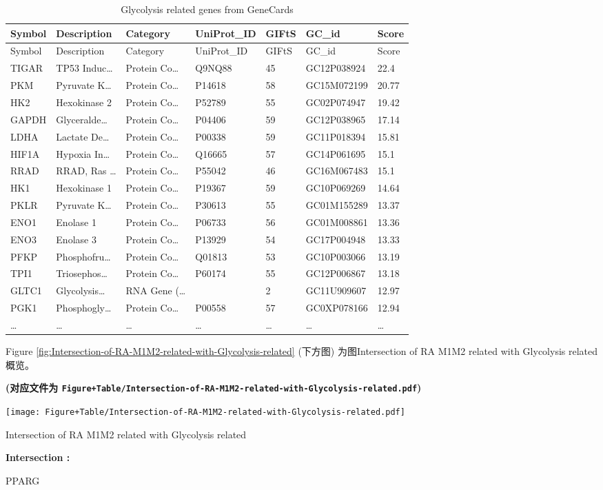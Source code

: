 \documentclass[
]{article}
\begin{document}
\begin{longtable}[]{@{}lllllll@{}}
\caption{\label{tab:Glycolysis-related-genes-from-GeneCards}Glycolysis related genes from GeneCards}\tabularnewline
\toprule
Symbol & Description & Category & UniProt\_ID & GIFtS & GC\_id & Score\tabularnewline
\midrule
\endfirsthead
\toprule
Symbol & Description & Category & UniProt\_ID & GIFtS & GC\_id & Score\tabularnewline
\midrule
\endhead
TIGAR & TP53 Induc\ldots{} & Protein Co\ldots{} & Q9NQ88 & 45 & GC12P038924 & 22.4\tabularnewline
PKM & Pyruvate K\ldots{} & Protein Co\ldots{} & P14618 & 58 & GC15M072199 & 20.77\tabularnewline
HK2 & Hexokinase 2 & Protein Co\ldots{} & P52789 & 55 & GC02P074947 & 19.42\tabularnewline
GAPDH & Glyceralde\ldots{} & Protein Co\ldots{} & P04406 & 59 & GC12P038965 & 17.14\tabularnewline
LDHA & Lactate De\ldots{} & Protein Co\ldots{} & P00338 & 59 & GC11P018394 & 15.81\tabularnewline
HIF1A & Hypoxia In\ldots{} & Protein Co\ldots{} & Q16665 & 57 & GC14P061695 & 15.1\tabularnewline
RRAD & RRAD, Ras \ldots{} & Protein Co\ldots{} & P55042 & 46 & GC16M067483 & 15.1\tabularnewline
HK1 & Hexokinase 1 & Protein Co\ldots{} & P19367 & 59 & GC10P069269 & 14.64\tabularnewline
PKLR & Pyruvate K\ldots{} & Protein Co\ldots{} & P30613 & 55 & GC01M155289 & 13.37\tabularnewline
ENO1 & Enolase 1 & Protein Co\ldots{} & P06733 & 56 & GC01M008861 & 13.36\tabularnewline
ENO3 & Enolase 3 & Protein Co\ldots{} & P13929 & 54 & GC17P004948 & 13.33\tabularnewline
PFKP & Phosphofru\ldots{} & Protein Co\ldots{} & Q01813 & 53 & GC10P003066 & 13.19\tabularnewline
TPI1 & Triosephos\ldots{} & Protein Co\ldots{} & P60174 & 55 & GC12P006867 & 13.18\tabularnewline
GLTC1 & Glycolysis\ldots{} & RNA Gene (\ldots{} & & 2 & GC11U909607 & 12.97\tabularnewline
PGK1 & Phosphogly\ldots{} & Protein Co\ldots{} & P00558 & 57 & GC0XP078166 & 12.94\tabularnewline
\ldots{} & \ldots{} & \ldots{} & \ldots{} & \ldots{} & \ldots{} & \ldots{}\tabularnewline
\bottomrule
\end{longtable}

Figure \ref{fig:Intersection-of-RA-M1M2-related-with-Glycolysis-related} (下方图) 为图Intersection of RA M1M2 related with Glycolysis related概览。

\textbf{(对应文件为 \texttt{Figure+Table/Intersection-of-RA-M1M2-related-with-Glycolysis-related.pdf})}

\def\@captype{figure}
\begin{center}
\texttt{[image: Figure+Table/Intersection-of-RA-M1M2-related-with-Glycolysis-related.pdf]}
\caption{Intersection of RA M1M2 related with Glycolysis related}\label{fig:Intersection-of-RA-M1M2-related-with-Glycolysis-related}
\end{center}
\begin{center}\begin{tcolorbox}[colback=gray!10, colframe=gray!50, width=0.9\linewidth, arc=1mm, boxrule=0.5pt]
\textbf{
Intersection
:}

\vspace{0.5em}

    PPARG

\vspace{2em}
\end{tcolorbox}
\end{center}
\end{document}
